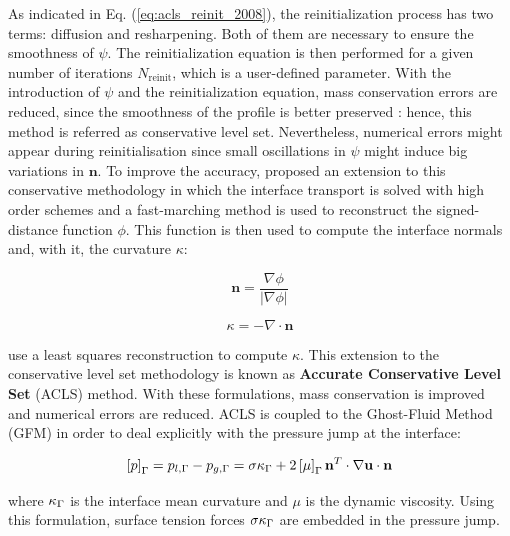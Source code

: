 As indicated in Eq. (\ref{eq:acls_reinit_2008}), the reinitialization process has two terms: diffusion and resharpening. Both of them are necessary to ensure the smoothness of $\psi$. The reinitialization equation is then performed for a given number of iterations $N_\mathrm{reinit}$, which is a user-defined parameter. With the introduction of $\psi$ and the reinitialization equation, mass conservation errors are reduced, since the smoothness of the profile is better preserved : hence, this method is referred as conservative level set. Nevertheless, numerical errors might appear during reinitialisation since small oscillations in $\psi$ might induce big variations in $\textbf{n}$. To improve the accuracy,  proposed an extension to this conservative methodology in which the interface transport is solved with high order schemes and a fast-marching method is used to reconstruct the signed-distance function $\phi$. This function is then used to compute the interface normals and, with it, the curvature $\kappa$: 

\begin{equation}
\textbf{n} = \frac{\nabla \phi}{| \nabla \phi |} 
\end{equation}

\begin{equation}
\kappa = - \nabla \cdot \textbf{n}
\end{equation}

 use a least squares reconstruction to compute $\kappa$. This extension to the conservative level set methodology is known as \textbf{Accurate Conservative Level Set} (ACLS) method. With these formulations, mass conservation is improved and numerical errors are reduced. ACLS is coupled to the Ghost-Fluid Method (GFM)  in order to deal explicitly with the pressure jump at the interface:

\begin{equation}
    \left[ p \right]_{\scriptsize{\Gamma}} = p_{l,{\scriptsize{\Gamma}}} - p_{g,{\scriptsize{\Gamma}}}  = \sigma \kappa_{\scriptsize{\Gamma}} + 2 \left[ \mu \right]_{\scriptsize{\Gamma}} \textbf{n}^T \cdot \nabla \textbf{u} \cdot \textbf{n}
\end{equation}

where $\kappa_{\scriptsize{\Gamma}}$ is the interface mean curvature and $\mu$ is the dynamic viscosity. Using this formulation, surface tension forces $\sigma\kappa_{\scriptsize{\Gamma}}$ are embedded in the pressure jump. \\

